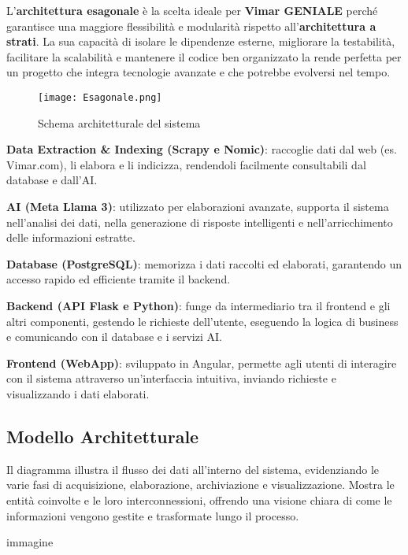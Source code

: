 L’\textbf{architettura esagonale} è la scelta ideale per \textbf{ Vimar GENIALE} perché garantisce una maggiore flessibilità e modularità rispetto all’\textbf{architettura a strati}. La sua capacità di isolare le dipendenze esterne, migliorare la testabilità, facilitare la scalabilità e mantenere il codice ben organizzato la rende perfetta per un progetto che integra tecnologie avanzate e che potrebbe evolversi nel tempo.
\begin{figure}[H]
    \centering
    \texttt{[image: Esagonale.png]}
    \caption{Schema architetturale del sistema}
    \label{fig:architettura}
\end{figure}
    \item \textbf{Data Extraction & Indexing (Scrapy e Nomic)}: raccoglie dati dal web (es. Vimar.com), li elabora e li indicizza, rendendoli facilmente consultabili dal database e dall'AI.
    \item \textbf{AI (Meta Llama 3)}: utilizzato per elaborazioni avanzate, supporta il sistema nell'analisi dei dati, nella generazione di risposte intelligenti e nell'arricchimento delle informazioni estratte.
    \item \textbf{Database (PostgreSQL)}: memorizza i dati raccolti ed elaborati, garantendo un accesso rapido ed efficiente tramite il backend.
    \item \textbf{Backend (API Flask e Python)}: funge da intermediario tra il frontend e gli altri componenti, gestendo le richieste dell’utente, eseguendo la logica di business e comunicando con il database e i servizi AI.
    \item \textbf{Frontend (WebApp)}: sviluppato in Angular, permette agli utenti di interagire con il sistema attraverso un’interfaccia intuitiva, inviando richieste e visualizzando i dati elaborati.
    \subsection{Modello Architetturale}
    \item Il diagramma illustra il flusso dei dati all'interno del sistema, evidenziando le varie fasi di acquisizione, elaborazione, archiviazione e visualizzazione. Mostra le entità coinvolte e le loro interconnessioni, offrendo una visione chiara di come le informazioni vengono gestite e trasformate lungo il processo.
    \item immagine
    
    
    
